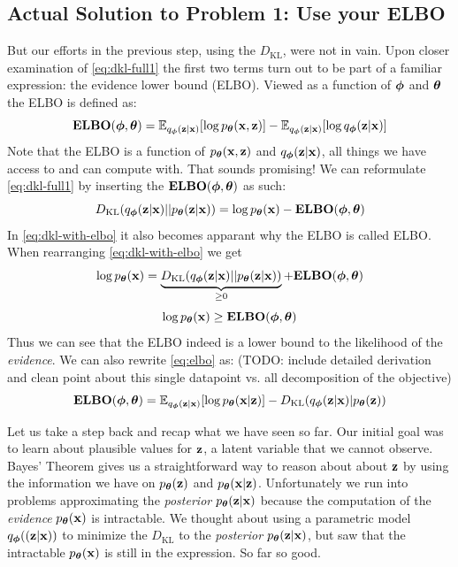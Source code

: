 \documentclass[11pt]{article}
\theoremstyle{definition}
\begin{document}
\subsection{Actual Solution to Problem 1: Use your ELBO}
But our efforts in the previous step, using the $D_{\text{KL}}$, were not in vain. Upon closer examination of \autoref{eq:dkl-full1} the first two terms turn out to be part of a familiar expression: the evidence lower bound (ELBO). Viewed as a function of $\boldsymbol{\phi}$ and $\boldsymbol{\theta}$ the ELBO is defined as:
\begin{equation}
	\mathbf{ELBO}(\boldsymbol{\phi}, \boldsymbol{\theta}) = \mathbb{E}_{q_{\boldsymbol{\phi}}(\mathbf{z}|\mathbf{x})}[\log p_{\boldsymbol{\theta}}(\mathbf{x},\mathbf{z})] - \mathbb{E}_{q_{\boldsymbol{\phi}}(\mathbf{z}|\mathbf{x})}[\log q_{\boldsymbol{\phi}}(\mathbf{z}|\mathbf{x})]
	\label{eq:elbo}
\end{equation}
Note that the ELBO is a function of $p_{\boldsymbol{\theta}}(\mathbf{x},\mathbf{z})$ and $q_{\boldsymbol{\phi}}(\mathbf{z}|\mathbf{x})$, all things we have access to and can compute with. That sounds promising! We can reformulate \autoref{eq:dkl-full1} by inserting the $\mathbf{ELBO}(\boldsymbol{\phi}, \boldsymbol{\theta})$ as such:
\begin{equation}
	D_{\text{KL}}(q_{\boldsymbol{\phi}}(\mathbf{z}|\mathbf{x})||p_{\boldsymbol{\theta}}(\mathbf{z}|\mathbf{x})) = \log p_{\boldsymbol{\theta}}(\mathbf{x}) - \mathbf{ELBO}(\boldsymbol{\phi}, \boldsymbol{\theta})
	\label{eq:dkl-with-elbo}
\end{equation}
In \autoref{eq:dkl-with-elbo} it also becomes apparant why the ELBO is called ELBO. When rearranging \autoref{eq:dkl-with-elbo} we get
\begin{equation}
	\log p_{\boldsymbol{\theta}}(\mathbf{x}) = \underbrace{D_{\text{KL}}(q_{\boldsymbol{\phi}}(\mathbf{z}|\mathbf{x})||p_{\boldsymbol{\theta}}(\mathbf{z}|\mathbf{x}))}_{\geq 0} + \mathbf{ELBO}(\boldsymbol{\phi}, \boldsymbol{\theta})
	\label{eq:elbo-as-lower-bound1}
\end{equation}
\begin{equation}
\log p_{\boldsymbol{\theta}}(\mathbf{x}) \geq \mathbf{ELBO}(\boldsymbol{\phi}, \boldsymbol{\theta})
\label{eq:elbo-as-lower-bound2}
\end{equation}
Thus we can see that the ELBO indeed is a lower bound to the likelihood of the \textit{evidence}. We can also rewrite \autoref{eq:elbo} as: (TODO: include detailed derivation and clean point about this single datapoint vs. all decomposition of the objective)
\begin{equation}
	\mathbf{ELBO}(\boldsymbol{\phi}, \boldsymbol{\theta}) = \mathbb{E}_{q_{\boldsymbol{\phi}}(\mathbf{z}|\mathbf{x})}[\log p_{\boldsymbol{\theta}}(\mathbf{x}|\mathbf{z})] - D_{\text{KL}}(q_{\boldsymbol{\phi}}(\mathbf{z}|\mathbf{x})|p_{\boldsymbol{\theta}}(\mathbf{z}))
	\label{eq:elbo-final}
\end{equation}
\par 
Let us take a step back and recap what we have seen so far. Our initial goal was to learn about plausible values for $\mathbf{z}$, a latent variable that we cannot observe. Bayes' Theorem gives us a straightforward way to reason about about $\mathbf{z}$ by using the information we have on $p_{\boldsymbol{\theta}}(\mathbf{z})$ and $p_{\boldsymbol{\theta}}(\mathbf{x}|\mathbf{z})$. Unfortunately we run into problems approximating the \textit{posterior} $p_{\boldsymbol{\theta}}(\mathbf{z}|\mathbf{x})$ because the computation of the \textit{evidence} $p_{\boldsymbol{\theta}}(\mathbf{x})$ is intractable. We thought about using a parametric model $q_{\boldsymbol{\phi}}((\mathbf{z}|\mathbf{x}))$ to minimize the $D_{\text{KL}}$ to the \textit{posterior} $p_{\boldsymbol{\theta}}(\mathbf{z}|\mathbf{x})$, but saw that the intractable $p_{\boldsymbol{\theta}}(\mathbf{x})$ is still in the expression. So far so good. 
\end{document}
